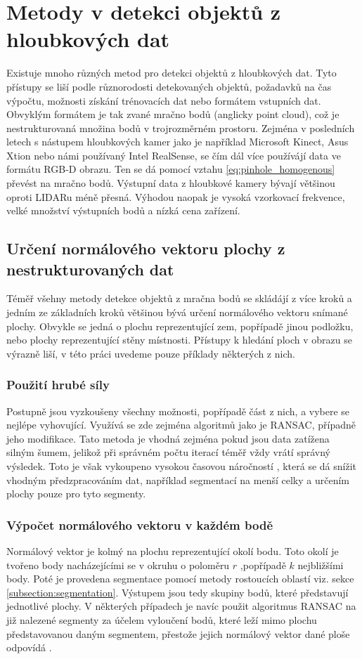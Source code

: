 \documentclass[twoside]{ctuthesis}
\begin{document}
\chapter{Metody v detekci objektů z hloubkových dat}
\label{sec:Metody_detekce}
Existuje mnoho různých metod pro detekci objektů z hloubkových dat. Tyto přístupy se liší podle různorodosti detekovaných objektů, požadavků na čas výpočtu, možnosti získání trénovacích dat nebo formátem vstupních dat. Obvyklým formátem je tak zvané mračno bodů (anglicky point cloud), což je nestrukturovaná množina bodů v trojrozměrném prostoru. Zejména v posledních letech s nástupem hloubkových kamer jako je například Microsoft Kinect, Asus Xtion nebo námi používaný Intel RealSense, se čím dál více používájí data ve formátu RGB-D obrazu. Ten se dá pomocí vztahu \ref{eq:pinhole_homogenous} převést na mračno bodů. Výstupní data z hloubkové kamery bývají většinou oproti LIDARu méně přesná. Výhodou naopak je vysoká vzorkovací frekvence, velké množství výstupních bodů a nízká cena zařízení.

\section{Určení normálového vektoru plochy z nestrukturovaných dat}
\label{sec:normal_methods}
Téměř všehny metody detekce objektů z mračna bodů se skládájí z více kroků a jedním ze základních kroků většinou bývá určení normálového vektoru snímané plochy. Obvykle se jedná o plochu reprezentující zem, popřípadě jinou podložku, nebo plochy reprezentující stěny místnosti. Přístupy k hledání ploch v obrazu se výrazně liší, v této práci uvedeme pouze příklady některých z nich.

\subsection{Použití hrubé síly}
Postupně jsou vyzkoušeny všechny možnosti, popřípadě část z nich, a vybere se nejlépe vyhovující. Využívá se zde zejména algoritmů jako je RANSAC, případně jeho modifikace. Tato metoda je vhodná zejména pokud jsou data zatížena silným šumem, jelikož při správném počtu iterací téměř vždy vrátí správný výsledek. Toto je však vykoupeno vysokou časovou náročností \cite{RANSAC_plane,single_RGBD_reconstruction}, která se dá snížit vhodným předzpracováním dat, například segmentací na menší celky a určením plochy pouze pro tyto segmenty. \cite{rusu2009close}
\subsection{Výpočet normálového vektoru v každém bodě}
Normálový vektor je kolmý na plochu reprezentující okolí bodu. Toto okolí je tvořeno body nacházejícími se v okruhu o poloměru $r$ \cite{wang2015dominant} ,popřípadě $k$ nejbližšími body\cite{holz2011real,trevor2013efficient}. Poté je provedena segmentace pomocí metody rostoucích oblastí viz. sekce \ref{subsection:segmentation}. Výstupem jsou tedy skupiny bodů, které představují jednotlivé plochy. V některých případech je navíc použit algoritmus RANSAC na již nalezené segmenty za účelem vyloučení bodů, které leží mimo plochu představovanou daným segmentem, přestože jejich normálový vektor dané ploše odpovídá \cite{lai2011large}.
\end{document}
